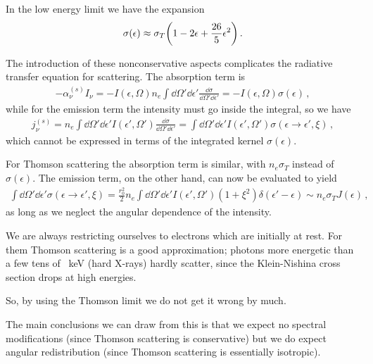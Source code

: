 \documentclass[main.tex]{subfiles}
\begin{document}
In the low energy limit we have the expansion 
%
\begin{align}
\sigma (\epsilon )\approx \sigma_T \qty(1 -2 \epsilon + \frac{26}{5} \epsilon^2)
\,.
\end{align}

The introduction of these nonconservative aspects complicates the radiative transfer equation for scattering.
The absorption term is 
%
\begin{align}
- \alpha _\nu ^{(s)} I _\nu =  
- I (\epsilon , \Omega ) n_e \int \dd{\Omega }' \dd{\epsilon }' \frac{ \dd{\sigma }}{ \dd{\Omega }' \dd{\epsilon }' } =     - I (\epsilon , \Omega  ) \sigma (\epsilon )
\,,
\end{align}
%
while for the emission term the intensity must go inside the integral, so we have 
%
\begin{align}
j_\nu^{(s)} = 
n_e \int \dd{\Omega }' \dd{\epsilon '} I(\epsilon ', \Omega ') \frac{ \dd{\sigma }}{ \dd{\Omega }' \dd{\epsilon }' } = \int \dd{\Omega }' \dd{\epsilon }'
I(\epsilon ', \Omega ')
 \sigma (\epsilon \to \epsilon ', \xi )
\,,
\end{align}
%
which cannot be expressed in terms of the integrated kernel \(\sigma (\epsilon )\). 

For Thomson scattering the absorption term is similar, with \(n_e \sigma_T\) instead of \(\sigma (\epsilon )\). 
The emission term, on the other hand, can now be evaluated to yield  
%
\begin{align}
\int \dd{\Omega }' \dd{\epsilon }' \sigma (\epsilon \to \epsilon ', \xi )
= \frac{r_0^2}{2} n_e \int \dd{\Omega '} \dd{\epsilon '} I(\epsilon ', \Omega ') (1 + \xi^2) \delta (\epsilon ' - \epsilon ) \sim n_e \sigma_T J(\epsilon )
\,,
\end{align}
%
as long as we neglect the angular dependence of the intensity. 

We are always restricting ourselves to electrons which are initially at rest. For them Thomson scattering is a good approximation; photons more energetic than a few tens of \SI{}{keV} (hard X-rays) hardly scatter, since the Klein-Nishina cross section drops at high energies.

So, by using the Thomson limit we do not get it wrong by much. 

The main conclusions we can draw from this is that we expect no spectral modifications (since Thomson scattering is conservative) but we do expect angular redistribution (since Thomson scattering is essentially isotropic).
\end{document}
